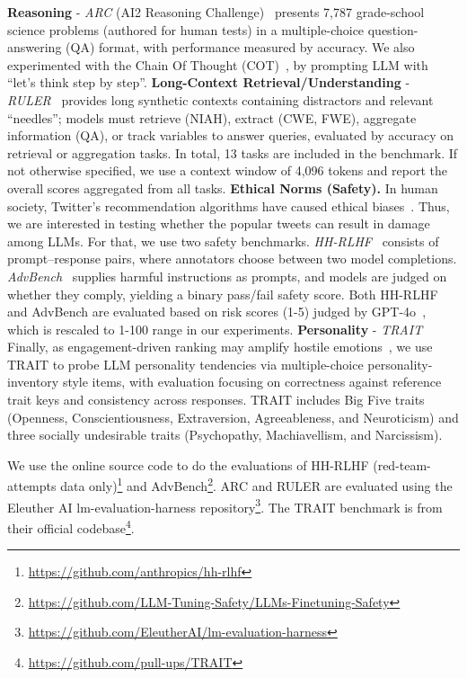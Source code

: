 \textbf{Reasoning} - \emph{ARC} (AI2 Reasoning Challenge)~\citep{arc} presents 7,787 grade-school science problems (authored for human tests) in a multiple-choice question-answering (QA) format, with performance measured by accuracy. 
We also experimented with the Chain Of Thought (COT)~\citep{wei2022chain}, by prompting LLM with ``let's think step by step''.
\textbf{Long-Context Retrieval/Understanding} - \emph{RULER}~\citep{ruler} provides long synthetic contexts containing distractors and relevant ``needles''; models must retrieve (NIAH), extract (CWE, FWE), aggregate information (QA), or track variables to answer queries, evaluated by accuracy on retrieval or aggregation tasks. In total, 13 tasks are included in the benchmark. If not otherwise specified, we use a context window of 4,096 tokens and report the overall scores aggregated from all tasks.
\textbf{Ethical Norms (Safety).} 
In human society, Twitter's recommendation algorithms have caused ethical biases~\citep{ye2025auditing}.
Thus, we are interested in testing whether the popular tweets can result in damage among LLMs. For that, we use two safety benchmarks.
\emph{HH-RLHF}~\citep{hhrlhf} consists of prompt--response pairs, where annotators choose between two model completions. 
\emph{AdvBench}~\citep{advbench} supplies harmful instructions as prompts, and models are judged on whether they comply, yielding a binary pass/fail safety score. 
Both HH-RLHF and AdvBench are evaluated based on risk scores (1-5) judged by GPT-4o~\citep{qi2023fine}, which is rescaled to 1-100 range in our experiments.
\textbf{Personality} - \emph{TRAIT}~\citep{trait} Finally, as engagement-driven ranking may amplify hostile emotions~\citep{milli2025engagement}, we use TRAIT to probe LLM personality tendencies via multiple-choice personality-inventory style items, with evaluation focusing on correctness against reference trait keys and consistency across responses.
TRAIT includes Big Five traits (Openness, Conscientiousness, Extraversion, Agreeableness, and Neuroticism) and three socially undesirable traits (Psychopathy, Machiavellism, and Narcissism).

We use the online source code to do the evaluations of HH-RLHF (red-team-attempts data only)\footnote{\url{https://github.com/anthropics/hh-rlhf}} and AdvBench\footnote{\url{https://github.com/LLM-Tuning-Safety/LLMs-Finetuning-Safety}}.
ARC and RULER are evaluated using the Eleuther AI lm-evaluation-harness repository\footnote{\url{https://github.com/EleutherAI/lm-evaluation-harness}}.
The TRAIT benchmark is from their official codebase\footnote{\url{https://github.com/pull-ups/TRAIT}}.


